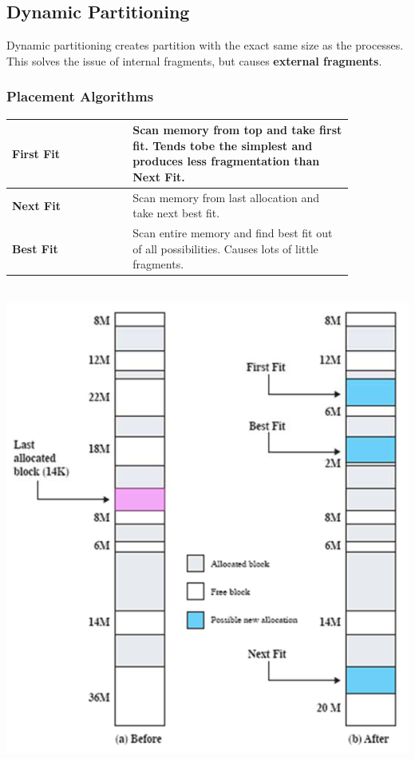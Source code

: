 	\subsection{Dynamic Partitioning }
	\begin{minipage}[t]{0.65\textwidth}		
			Dynamic partitioning creates partition with the exact same size as the processes. This solves the issue of internal fragments, but causes \textbf{external fragments}.
			
			\subsubsection{Placement Algorithms}
				\begin{table}[H]
					\centering
					\begin{tabular}{|p{0.3\linewidth}|p{0.55\linewidth}|}
						\hline
						\textbf{First Fit}
							& Scan memory from top and take first fit. Tends tobe the simplest and produces less fragmentation than \textbf{Next Fit}.\\
						\hline
						\textbf{Next Fit}
							& Scan memory from last allocation and take next best fit.\\
						\hline
						\textbf{Best Fit}
							& Scan entire memory and find best fit out of all possibilities. Causes lots of little fragments.\\
						\hline	
					\end{tabular}
				\end{table}
	\end{minipage}	
	\begin{minipage}[t]{0.3\textwidth}
		\ \\ \includegraphics[scale=0.8]{./pictures/dynamic_partitioning.png}
	\end{minipage} \ \\ \ \\
			
